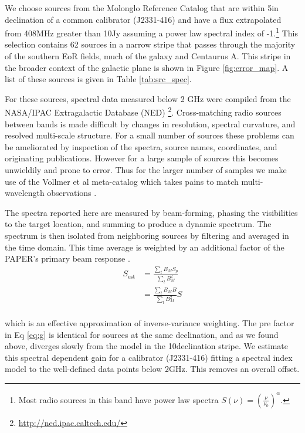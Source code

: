 \documentclass[preprint]{aastex}
\begin{document}
We choose sources from the Molonglo
Reference Catalog \cite[MRC]{Large:1981p7798} that are within 5\arcdeg in
declination of a common calibrator (J2331-416) and have a flux extrapolated
from 408MHz greater than 10Jy assuming a power law spectral index of
-1.\footnote{Most radio sources in this band have power law spectra $S(\nu) =
\left(\frac{\nu}{\nu_0}\right)^\alpha$. } This selection contains 62 sources in a narrow
stripe that passes through the majority of the southern EoR fields, much of the
galaxy and Centaurus A. This stripe in the broader context of the galactic plane
is shown in Figure \ref{fig:error_map}.
A list of these 
sources is given in Table \ref{tab:src_spec}. 

For these sources, spectral data measured below 2 GHz were compiled from 
the NASA/IPAC Extragalactic Database (NED)
\footnote{\url{http://ned.ipac.caltech.edu/}}. Cross-matching radio sources
between bands is made difficult by changes in resolution, spectral curvature,
and resolved multi-scale structure.  For a small number of sources these
problems can be ameliorated by inspection of the spectra, source names,
coordinates,  and originating publications. However for a large sample of
sources this becomes unwieldily and prone to error. Thus for the larger number
of samples we make use of the Vollmer et al meta-catalog which takes pains to
match multi-wavelength observations \citep{Vollmer:2010p6422}.

The spectra reported here are measured by beam-forming, phasing the visibilities to
the target location, and summing to produce a dynamic spectrum. The spectrum is then isolated
from neighboring sources by filtering and averaged in the time domain.  This time average is 
weighted by an additional factor of the PAPER's primary beam response 
\citep{pober_et_al2012}.  
\begin{align}
S_\textrm{est} &= \frac{\sum_t B_M S_p}{\sum_t B^2_M}\\
&= \frac{\sum_t B_M B}{\sum_t B^2_M} S\\ \label{eq:g}
\end{align}

which is an effective approximation of inverse-variance weighting. The pre factor in Eq \ref{eq:g} is identical for 
sources at the same declination, and as we found above, diverges slowly from the model in the 10\arcdeg declination stripe.
We estimate this spectral dependent gain for a calibrator (J2331-416) fitting a spectral index model to the
 well-defined data points below 2GHz. This removes an overall offset.
 
\end{document}
